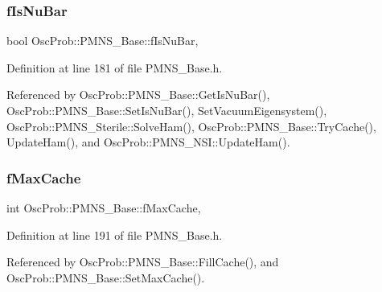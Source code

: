 \mbox{\label{classOscProb_1_1PMNS__Base_a0ebaeaefab36a3ff381c6293faedfdd6}} 
\subsubsection{\texorpdfstring{f\+Is\+Nu\+Bar}{fIsNuBar}}
{\footnotesize\ttfamily bool Osc\+Prob\+::\+P\+M\+N\+S\+\_\+\+Base\+::f\+Is\+Nu\+Bar\hspace{0.3cm}{\ttfamily [protected]}, {\ttfamily [inherited]}}



Definition at line 181 of file P\+M\+N\+S\+\_\+\+Base.\+h.



Referenced by Osc\+Prob\+::\+P\+M\+N\+S\+\_\+\+Base\+::\+Get\+Is\+Nu\+Bar(), Osc\+Prob\+::\+P\+M\+N\+S\+\_\+\+Base\+::\+Set\+Is\+Nu\+Bar(), Set\+Vacuum\+Eigensystem(), Osc\+Prob\+::\+P\+M\+N\+S\+\_\+\+Sterile\+::\+Solve\+Ham(), Osc\+Prob\+::\+P\+M\+N\+S\+\_\+\+Base\+::\+Try\+Cache(), Update\+Ham(), and Osc\+Prob\+::\+P\+M\+N\+S\+\_\+\+N\+S\+I\+::\+Update\+Ham().

\mbox{\label{classOscProb_1_1PMNS__Base_a74c13356eafec2490d8c3c19759ba7f0}} 
\subsubsection{\texorpdfstring{f\+Max\+Cache}{fMaxCache}}
{\footnotesize\ttfamily int Osc\+Prob\+::\+P\+M\+N\+S\+\_\+\+Base\+::f\+Max\+Cache\hspace{0.3cm}{\ttfamily [protected]}, {\ttfamily [inherited]}}



Definition at line 191 of file P\+M\+N\+S\+\_\+\+Base.\+h.



Referenced by Osc\+Prob\+::\+P\+M\+N\+S\+\_\+\+Base\+::\+Fill\+Cache(), and Osc\+Prob\+::\+P\+M\+N\+S\+\_\+\+Base\+::\+Set\+Max\+Cache().

